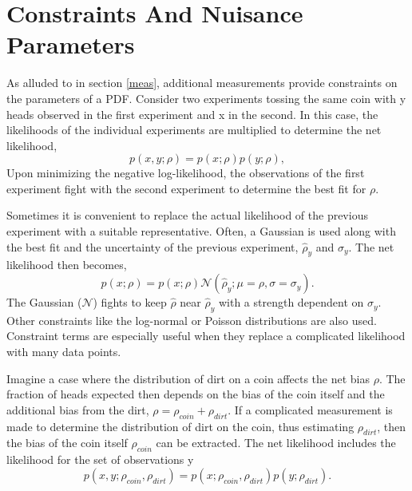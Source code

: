 \section{Constraints And Nuisance Parameters}
\label{constraints}

As alluded to in section \ref{meas}, additional measurements provide constraints on the parameters of a PDF. Consider two experiments tossing the same coin with y heads observed in the first experiment and x in the second. In this case, the likelihoods of the individual experiments are multiplied to determine the net likelihood, 
\begin{equation}
p(x, y; \rho) = p(x; \rho)p(y; \rho),
\end{equation}
Upon minimizing the negative log-likelihood, the observations of the first experiment fight with the second experiment to determine the best fit for $\rho$. 

Sometimes it is convenient to replace the actual likelihood of the previous experiment with a suitable representative. Often, a Gaussian is used along with the best fit and the uncertainty of the previous experiment, $\hat{\rho}_{y}$ and $\sigma_y$. The net likelihood then becomes,
\begin{equation}
p(x; \rho) = p(x; \rho) \mathcal{N}(\hat{\rho}_y; \mu=\rho, \sigma=\sigma_y).
\end{equation}
The Gaussian ($\mathcal{N}$) fights to keep $\hat{\rho}$ near $\hat{\rho}_y$ with a strength dependent on $\sigma_y$. Other constraints like the log-normal or Poisson distributions are also used. Constraint terms are especially useful when they replace a complicated likelihood with many data points. 

Imagine a case where the distribution of dirt on a coin affects the net bias $\rho$. The fraction of heads expected then depends on the bias of the coin itself and the additional bias from the dirt, $\rho = \rho_{coin} + \rho_{dirt}$. If a complicated measurement is made to determine the distribution of dirt on the coin, thus estimating $\rho_{dirt}$, then the bias of the coin itself $\rho_{coin}$ can be extracted. The net likelihood includes the likelihood for the set of observations y
\begin{equation}
p(x, y; \rho_{coin}, \rho_{dirt}) = p(x; \rho_{coin}, \rho_{dirt})p(y; \rho_{dirt}).
\end{equation}


